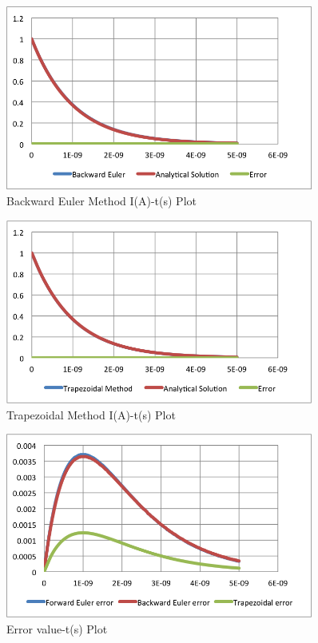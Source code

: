 \documentclass[12pt,a4paper]{book}
\begin{document}
\begin{figure}[h!]
  \centering
     \includegraphics[width=0.9\textwidth]{./backward.png}
  \caption{Backward Euler Method I(A)-t(s) Plot}
\end{figure}


\begin{figure}[h!]
  \centering
     \includegraphics[width=0.9\textwidth]{./trapezoidal.png}
  \caption{Trapezoidal Method I(A)-t(s) Plot}
\end{figure}

\begin{figure}[h!]
  \centering
     \includegraphics[width=0.9\textwidth]{./error.png}
  \caption{Error  value-t(s) Plot}
\end{figure}
\end{document}
